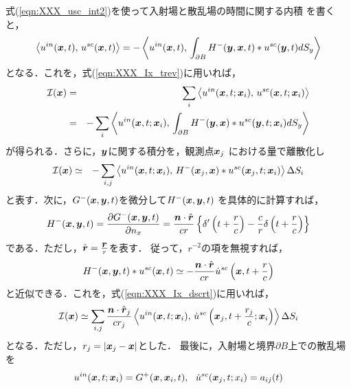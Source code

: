 式(\ref{eqn:XXX_usc_int2})を使って入射場と散乱場の時間に関する内積
を書くと，
\begin{equation}
	\left<
		u^{in}(\mbox{\boldmath $x$},t),\, 
		u^{sc}(\mbox{\boldmath $x$},t)
	\right>
	=-
	\left<
		u^{in}(\mbox{\boldmath $x$},t),\, 
		\int_{\partial B} 
		H^{-}(\mbox{\boldmath $y$},\mbox{\boldmath $x$},t)*u^{sc}(\mbox{\boldmath $y$},t)
	dS_y
	\right>
	\label{eqn:}
\end{equation}
となる．これを，式(\ref{eqn:XXX_Ix_trev})に用いれば，
\begin{eqnarray}
	{\cal I}(\mbox{\boldmath $x$})
	 &=&
	\sum_{i}
	\left<
		u^{in}(\mbox{\boldmath $x$},t;\mbox{\boldmath $x$}_i),\, 
		u^{sc}(\mbox{\boldmath $x$},t;\mbox{\boldmath $x$}_i)
	\right>
	\\	
	&=&-
	\sum_{i}
	\left<
		u^{in}(\mbox{\boldmath $x$},t;\mbox{\boldmath $x$}_i),\, 
		\int_{\partial B} 
		H^{-}(\mbox{\boldmath $y$},\mbox{\boldmath $x$})*u^{sc}(\mbox{\boldmath $y$},t;\mbox{\boldmath $x$}_i)
		dS_y
	\right>
	\label{eqn:}
\end{eqnarray}
が得られる．さらに，$\mbox{\boldmath $y$}$に関する積分を，観測点$\mbox{\boldmath $x$}_j$
における量で離散化し
\begin{eqnarray}
	{\cal I}(\mbox{\boldmath $x$})
	&\simeq&
	-
	\sum_{i,j}
	\left<
		u^{in}(\mbox{\boldmath $x$},t;\mbox{\boldmath $x$}_i),\, 
		H^{-}(\mbox{\boldmath $x$}_j,\mbox{\boldmath $x$})*u^{sc}(\mbox{\boldmath $x$}_j,t;\mbox{\boldmath $x$}_i)
	\right>
	\Delta S_i 
	\label{eqn:XXX_Ix_dscrt}
\end{eqnarray}
と表す．次に，$G^{-}(\mbox{\boldmath $x$},\mbox{\boldmath $y$},t)$を微分して$H^{-}(\mbox{\boldmath $x$},\mbox{\boldmath $y$},t)$
を具体的に計算すれば，
\begin{equation}
	H^-(\mbox{\boldmath $x$},\mbox{\boldmath $y$},t)
	=
	\frac{\partial G^-(\mbox{\boldmath $x$},\mbox{\boldmath $y$},t)}{\partial n_x}
	=
	\frac{\mbox{\boldmath $n$}\cdot \hat{\mbox{\boldmath $r$}}}{cr}
	\left\{
		\delta'\left(t+\frac{r}{c}\right)
		-\frac{c}{r}
		\delta\left(t+\frac{r}{c}\right)
	\right\}
	\label{eqn:XXX_Hm_explicit}
\end{equation}
である．ただし，$\hat{\mbox{\boldmath $r$}}=\frac{\mbox{\boldmath $r$}}{r}$を表す．
従って，$r^{-2}$の項を無視すれば，
\begin{equation}
	H^{-}(\mbox{\boldmath $x$},\mbox{\boldmath $y$},t)*u^{sc}(\mbox{\boldmath $x$},t)
	\simeq 
	-\frac{\mbox{\boldmath $n$}\cdot \hat{\mbox{\boldmath $r$}}}{cr}
	\dot{u}^{sc}\left(\mbox{\boldmath $x$},t+\frac{r}{c}\right)
	\label{eqn:}
\end{equation}
と近似できる．これを，式(\ref{eqn:XXX_Ix_dscrt})に用いれば，
\begin{equation}
	{\cal I}(\mbox{\boldmath $x$})
	\simeq 
	\sum_{i,j}
	\frac{\mbox{\boldmath $n$}\cdot\hat{\mbox{\boldmath $r$}}_j}{cr_j}
	\left<
		u^{in}(\mbox{\boldmath $x$},t;\mbox{\boldmath $x$}_i),\, 
		\dot{u}^{sc}\left(\mbox{\boldmath $x$}_j,t+\frac{r_j}{c};\mbox{\boldmath $x$}_i\right)
	\right>
	\Delta S_i 
	\label{eqn:}
\end{equation}
となる．ただし，$r_j=|\mbox{\boldmath $x$}_j-\mbox{\boldmath $x$}|$とした．
最後に，入射場と境界$\partial B$上での散乱場を
\begin{equation}
	u^{in}(\fat{x},t;\fat{x}_i) = G^+(\fat{x},\fat{x}_i,t), \ \ 
	\dot{u}^{sc}(\fat{x}_j,t;x_i)=a_{ij}(t)
	\label{eqn:}
\end{equation}
